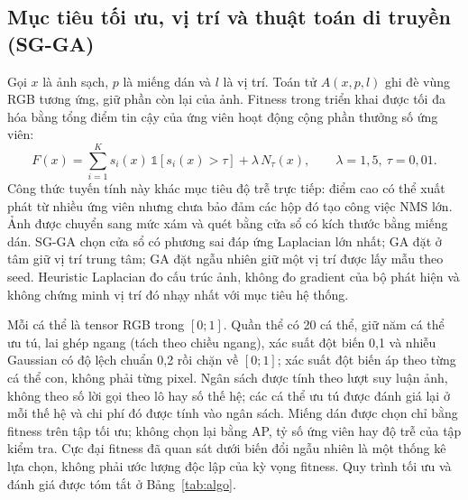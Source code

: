 \documentclass[a4paper,fleqn]{cas-dc}
\newcommand{\Ntau}{N_{\tau}}
\begin{document}
\subsection{Mục tiêu tối ưu, vị trí và thuật toán di truyền (SG-GA)}
Gọi $x$ là ảnh sạch, $p$ là miếng dán và $l$ là vị trí. Toán tử $A(x,p,l)$ ghi đè vùng RGB tương ứng, giữ phần còn lại của ảnh. Fitness trong triển khai được tối đa hóa bằng tổng điểm tin cậy của ứng viên hoạt động cộng phần thưởng số ứng viên:
\begin{equation}
F(x)=\sum_{i=1}^{K} s_i(x)\,\mathbb{1}[s_i(x)>\tau]+\lambda\,\Ntau(x),\qquad \lambda=1{,}5,\ \tau=0{,}01 .
\end{equation}
Công thức tuyến tính này khác mục tiêu độ trễ trực tiếp: điểm cao có thể xuất phát từ nhiều ứng viên nhưng chưa bảo đảm các hộp đó tạo công việc NMS lớn. Ảnh được chuyển sang mức xám và quét bằng cửa sổ có kích thước bằng miếng dán. SG-GA chọn cửa sổ có phương sai đáp ứng Laplacian lớn nhất; GA đặt ở tâm giữ vị trí trung tâm; GA đặt ngẫu nhiên giữ một vị trí được lấy mẫu theo seed. Heuristic Laplacian đo cấu trúc ảnh, không đo gradient của bộ phát hiện và không chứng minh vị trí đó nhạy nhất với mục tiêu hệ thống.

Mỗi cá thể là tensor RGB trong $[0;1]$. Quần thể có 20 cá thể, giữ năm cá thể ưu tú, lai ghép ngang (tách theo chiều ngang), xác suất đột biến 0,1 và nhiễu Gaussian có độ lệch chuẩn 0,2 rồi chặn về $[0;1]$; xác suất đột biến áp theo từng cá thể con, không phải từng pixel. Ngân sách được tính theo lượt suy luận ảnh, không theo số lời gọi theo lô hay số thế hệ; các cá thể ưu tú được đánh giá lại ở mỗi thế hệ và chi phí đó được tính vào ngân sách. Miếng dán được chọn chỉ bằng fitness trên tập tối ưu; không chọn lại bằng AP, tỷ số ứng viên hay độ trễ của tập kiểm tra. Cực đại fitness đã quan sát dưới biến đổi ngẫu nhiên là một thống kê lựa chọn, không phải ước lượng độc lập của kỳ vọng fitness. Quy trình tối ưu và đánh giá được tóm tắt ở Bảng~\ref{tab:algo}.
\end{document}
